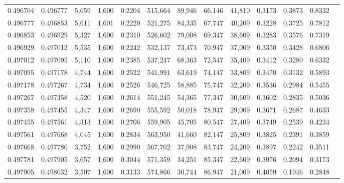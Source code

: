 \begin{tabular}{rrrrrrrrrrrrr}
0.496704 & 0.496777 &  5,659 & 1,600 &                                     0.2204 & 515,664 &  89,946 &  66,146 &  41,810 & 0.3173 & 0.3873 & 0.8332 \\
0.496777 & 0.496853 &  5,611 & 1,601 &                                     0.2220 & 521,275 &  84,335 &  67,747 &  40,209 & 0.3228 & 0.3725 & 0.7812 \\
0.496853 & 0.496929 &  5,327 & 1,600 &                                     0.2310 & 526,602 &  79,008 &  69,347 &  38,609 & 0.3283 & 0.3576 & 0.7319 \\
0.496929 & 0.497012 &  5,535 & 1,600 &                                     0.2242 & 532,137 &  73,473 &  70,947 &  37,009 & 0.3350 & 0.3428 & 0.6806 \\
0.497012 & 0.497095 &  5,110 & 1,600 &                                     0.2385 & 537,247 &  68,363 &  72,547 &  35,409 & 0.3412 & 0.3280 & 0.6332 \\
0.497095 & 0.497178 &  4,744 & 1,600 &                                     0.2522 & 541,991 &  63,619 &  74,147 &  33,809 & 0.3470 & 0.3132 & 0.5893 \\
0.497178 & 0.497267 &  4,734 & 1,600 &                                     0.2526 & 546,725 &  58,885 &  75,747 &  32,209 & 0.3536 & 0.2984 & 0.5455 \\
0.497267 & 0.497358 &  4,520 & 1,600 &                                     0.2614 & 551,245 &  54,365 &  77,347 &  30,609 & 0.3602 & 0.2835 & 0.5036 \\
0.497358 & 0.497455 &  4,347 & 1,600 &                                     0.2690 & 555,592 &  50,018 &  78,947 &  29,009 & 0.3671 & 0.2687 & 0.4633 \\
0.497455 & 0.497561 &  4,313 & 1,600 &                                     0.2706 & 559,905 &  45,705 &  80,547 &  27,409 & 0.3749 & 0.2539 & 0.4234 \\
0.497561 & 0.497668 &  4,045 & 1,600 &                                     0.2834 & 563,950 &  41,660 &  82,147 &  25,809 & 0.3825 & 0.2391 & 0.3859 \\
0.497668 & 0.497780 &  3,752 & 1,600 &                                     0.2990 & 567,702 &  37,908 &  83,747 &  24,209 & 0.3897 & 0.2242 & 0.3511 \\
0.497781 & 0.497905 &  3,657 & 1,600 &                                     0.3044 & 571,359 &  34,251 &  85,347 &  22,609 & 0.3976 & 0.2094 & 0.3173 \\
0.497905 & 0.498032 &  3,507 & 1,600 &                                     0.3133 & 574,866 &  30,744 &  86,947 &  21,009 & 0.4059 & 0.1946 & 0.2848 \\

\end{tabular}
